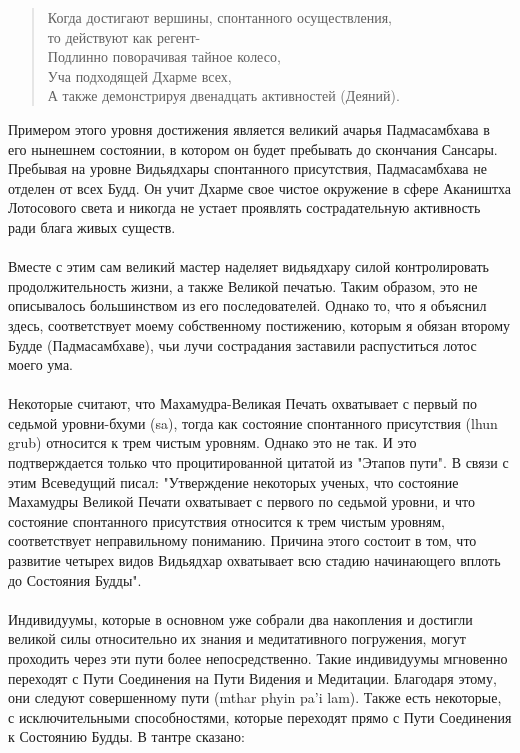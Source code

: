 \begin{verse}
Когда достигают вершины, спонтанного осуществления,\\
то действуют как регент-\\
Подлинно поворачивая тайное колесо,\\
Уча подходящей Дхарме всех,\\
А также демонстрируя двенадцать активностей (Деяний).
\end{verse}

Примером этого уровня достижения является великий ачарья Падмасамбхава в его
нынешнем состоянии, в котором он будет пребывать до скончания Сансары. Пребывая на
уровне Видьядхары спонтанного присутствия, Падмасамбхава не отделен от всех Будд. Он
учит Дхарме свое чистое окружение в сфере Акаништха Лотосового света и никогда не
устает проявлять сострадательную активность ради блага живых существ.\\
\\
Вместе с этим сам великий мастер наделяет видьядхару силой контролировать
продолжительность жизни, а также Великой печатью. Таким образом, это не описывалось
большинством из его последователей. Однако то, что я объяснил здесь, соответствует моему
собственному постижению, которым я обязан второму Будде (Падмасамбхаве), чьи лучи
сострадания заставили распуститься лотос моего ума. \\
\\
Некоторые считают, что Махамудра-Великая Печать охватывает с первый по
седьмой уровни-бхуми (sa), тогда как состояние спонтанного присутствия (lhun grub)
относится к трем чистым уровням. Однако это не так. И это подтверждается только что
процитированной цитатой из "Этапов пути". В связи с этим Всеведущий писал:
"Утверждение некоторых ученых, что состояние Махамудры Великой Печати охватывает с
первого по седьмой уровни, и что состояние спонтанного присутствия относится к трем
чистым уровням, соответствует неправильному пониманию. Причина этого состоит в том,
что развитие четырех видов Видьядхар охватывает всю стадию начинающего вплоть до
Состояния Будды". \\
\\
Индивидуумы, которые в основном уже собрали два накопления и достигли великой
силы относительно их знания и медитативного погружения, могут проходить через эти пути
более непосредственно. Такие индивидуумы мгновенно переходят с Пути Соединения на
Пути Видения и Медитации. Благодаря этому, они следуют совершенному пути (mthar phyin
pa'i lam). Также есть некоторые, с исключительными способностями, которые переходят
прямо с Пути Соединения к Состоянию Будды. В тантре сказано:


